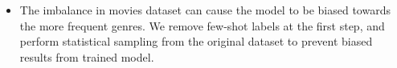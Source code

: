 \documentclass[hbrs-poster.tex]{subfiles}
\begin{document}
{\begin{itemize}
\begin{itemize}
\begin{tikzfigure}
                \end{tikzfigure}
                \item The imbalance in movies dataset can cause the model to be biased towards the more frequent genres. We remove few-shot labels at the first step, and perform statistical sampling from the original dataset to prevent biased results from trained model.
                
                
            \end{itemize}      
        \end{itemize}   
    }
\end{document}
